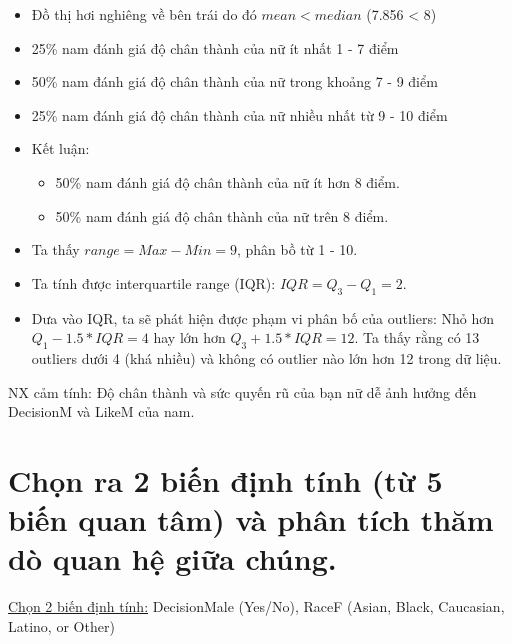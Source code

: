 \documentclass[a4paper,12pt]{article}
\begin{document}
\begin{enumerate}[label = {\alph*)}]
\begin{itemize}
					
					\begin{itemize}
						\item Đồ thị hơi nghiêng về bên trái do đó $mean < median$ (7.856 < 8)
						\item 25\% nam đánh giá độ chân thành của nữ ít nhất 1 - 7 điểm
						\item 50\% nam đánh giá độ chân thành của nữ trong khoảng 7 - 9 điểm
						\item 25\% nam đánh giá độ chân thành của nữ nhiều nhất từ 9 - 10 điểm
						 
						\item Kết luận:
							\begin{itemize}
								\item 50\% nam đánh giá độ chân thành của nữ ít hơn 8 điểm.
								\item 50\% nam đánh giá độ chân thành của nữ trên 8 điểm.
							\end{itemize}
								\item Ta thấy $range = Max - Min = 9$, phân bồ từ 1 - 10.
							\item Ta tính được interquartile range (IQR): $IQR = Q_3 - Q_1 = 2$.
							\item Dưa vào IQR, ta sẽ phát hiện được phạm vi phân bố của outliers:
							Nhỏ hơn $Q_1 - 1.5*IQR = 4$ hay lớn hơn $Q_3 + 1.5*IQR = 12$. Ta thấy rằng có 13 outliers dưới 4 (khá nhiều) và không có outlier nào lớn hơn 12 trong dữ liệu.
					\end{itemize}
					
				
				NX cảm tính: Độ chân thành và sức quyến rũ của bạn nữ dễ ảnh hưởng đến DecisionM và LikeM của nam.
					
				\end{itemize}
				
		\end{enumerate}
	
	\section{Chọn ra 2 biến định tính (từ 5 biến quan tâm) và phân tích thăm dò quan hệ giữa chúng.}
	
	\underline{Chọn 2 biến định tính:} DecisionMale (Yes/No), RaceF (Asian, Black, Caucasian, Latino, or Other)\\
	
\end{document}

